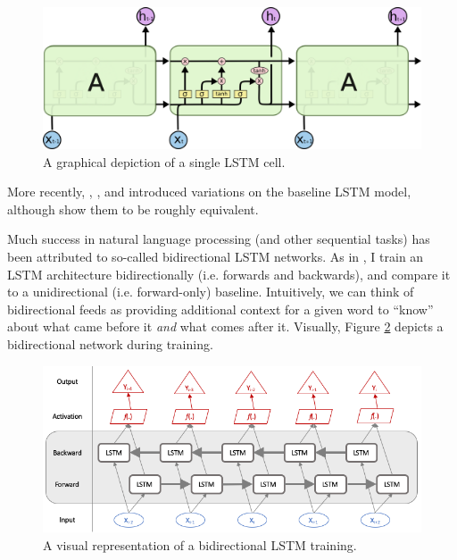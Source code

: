 \documentclass{article}
\begin{document}
	\begin{figure}[H]
		\includegraphics[width=\textwidth]{figures/images/lstm-math.png}
		\caption{A graphical depiction of a single LSTM cell.}
		\label{fig:lstm}
	\end{figure}

	More recently, \citet{gers2000recurrent}, \citet{chung2014empirical}, and \citet{yao2015depth} introduced variations on the baseline \citet{hochreiter1997long} LSTM model, although \citet{greff2016lstm} show them to be roughly equivalent. 
	
	Much success in natural language processing (and other sequential tasks) has been attributed to so-called bidirectional LSTM networks. As in \citet{wang2015unified}, I train an LSTM architecture bidirectionally (i.e. forwards and backwards), and compare it to a unidirectional (i.e. forward-only) baseline. Intuitively, we can think of bidirectional feeds as providing additional context for a given word to ``know'' about what came before it \textit{and} what comes after it. Visually, Figure \ref{fig:bidirectional} depicts a bidirectional network during training. 
	 
	 \begin{figure}[H]
	 	\includegraphics[width=\textwidth]{figures/images/bidirectional-net.png}
	 	\caption{A visual representation of a bidirectional LSTM training.}
	 	\label{fig:bidirectional}
	 \end{figure}
	
\end{document}
